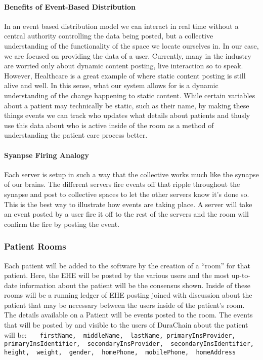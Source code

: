 \documentclass[letterpaper]{article}
\begin{document}
    \paragraph{Benefits of Event-Based Distribution}
    In an event based distribution model we can interact in real time without a central authority controlling the data being posted, but a collective understanding of the functionality of the space we locate ourselves in. In our case, we are focused on providing the data of a user. Currently, many in the industry are worried only about dynamic content posting, live interaction so to speak. However, Healthcare is a great example of where static content posting is still alive and well. In this sense, what our system allows for is a dynamic understanding of the change happening to static content. While certain variables about a patient may technically be static, such as their name, by making these things events we can track who updates what details about patients and thusly use this data about who is active inside of the room as a method of understanding the patient care process better.
%
    \paragraph{Syanpse Firing Analogy}
    Each server is setup in such a way that the collective works much like the synapse of our brains. The different servers fire events off that ripple throughout the synapse and post to collective spaces to let the other servers know it’s done so. This is the best way to illustrate how events are taking place. A server will take an event posted by a user fire it off to the rest of the servers and the room will confirm the fire by posting the event.
%
  \subsubsection{Patient Rooms}
  Each patient will be added to the software by the creation of a “room” for that patient. Here, the EHE will be posted by the various users and the most up-to-date information about the patient will be the consensus shown. Inside of these rooms will be a running ledger of EHE posting joined with discussion about the patient that may be necessary between the users inside of the patient’s room.
%
  The details available on a Patient will be events posted to the room. The events that will be posted by and visible to the users of DuraChain about the patient will be:
%
  \texttt{
  { 
  firstName, 
  middleName, 
  lastName,
  primaryInsProvider,
  primaryInsIdentifier, 
  secondaryInsProvider, 
  secondaryInsIdentifier, 
  height, 
  weight, 
  gender, 
  homePhone, 
  mobilePhone, 
  homeAddress
  }
  }
%
\end{document}
